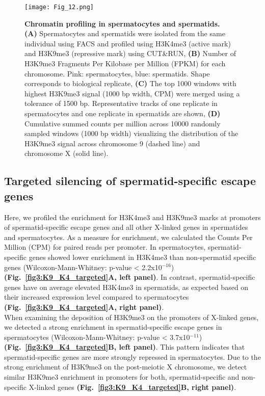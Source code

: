 \begin{figure}[!h]
\centering
\texttt{[image: Fig\_12.png]}
\caption[Chromatin profiling in spermatocytes and spermatids]{\textbf{Chromatin profiling in spermatocytes and spermatids.} \\
\textbf{(A)} Spermatocytes and spermatids were isolated from the same individual using FACS and profiled using H3K4me3 (active mark) and H3K9me3 (repressive mark) using CUT\&{}RUN, \textbf{(B)} Number of H3K9me3 Fragments Per Kilobase per Million (FPKM) for each chromosome. Pink: spermatocytes, blue: spermatids. Shape corresponds to biological replicate, \textbf{(C)} The top 1000 windows with highest H3K9me3 signal (1000 bp width, CPM) were merged using a tolerance of 1500 bp. Representative tracks of one replicate in spermatocytes and one replicate in spermatids are shown, \textbf{(D)} Cumulative summed counts per million across 10000 randomly sampled windows (1000 bp width) visualizing the distribution of the H3K9me3 signal across chromosome 9 (dashed line) and chromosome X (solid line).}
\label{fig3:K9_global}
\end{figure}

\newpage

\subsection{Targeted silencing of spermatid-specific escape genes}

Here, we profiled the enrichment for H3K4me3 and H3K9me3 marks at promoters of spermatid-specific escape genes and all other X-linked genes in spermatides and spermatocytes. As a measure for enrichment, we calculated the Counts Per Million (CPM) for paired reads per promoter. In spermatocytes, spermatid-specific genes showed lower enrichment in H3K4me3 than non-spermatid specific genes (Wilcoxon-Mann-Whitney: p-value < 2.2x10$^{-16}$) \textbf{(Fig.~\ref{fig3:K9_K4_targeted}A, left panel)}. In contrast, spermatid-specific genes have on average elevated H3K4me3 in spermatids, as expected based on their increased expression level compared to spermatocytes \textbf{(Fig.~\ref{fig3:K9_K4_targeted}A, right panel)}. \\


When examining the deposition of H3K9me3 on the promoters of X-linked genes, we detected a strong enrichment in spermatid-specific escape genes in spermatocytes (Wilcoxon-Mann-Whitney: p-value < 3.7x10$^{-11}$) \textbf{(Fig.~\ref{fig3:K9_K4_targeted}B, left panel)}. This pattern indicates that spermatid-specific genes are more strongly repressed in spermatocytes. Due to the strong enrichment of H3K9me3 on the post-meiotic X chromosome, we detect similar H3K9me3 enrichment in promoters for both, spermatid-specific and non-specific X-linked genes \textbf{(Fig.~\ref{fig3:K9_K4_targeted}B, right panel)}.\\

